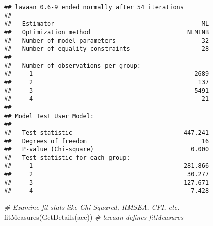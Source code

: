 \documentclass[smallextended]{svjour3}       %
\newenvironment{Shaded}{\begin{snugshade}}{\end{snugshade}}
\newcommand{\CommentTok}[1]{\textcolor[rgb]{0.56,0.35,0.01}{\textit{#1}}}
\newcommand{\FunctionTok}[1]{\textcolor[rgb]{0.00,0.00,0.00}{#1}}
\newcommand{\NormalTok}[1]{#1}
\begin{document}
\begin{verbatim}
## lavaan 0.6-9 ended normally after 54 iterations
## 
##   Estimator                                         ML
##   Optimization method                           NLMINB
##   Number of model parameters                        32
##   Number of equality constraints                    28
##                                                       
##   Number of observations per group:                   
##     1                                             2689
##     2                                              137
##     3                                             5491
##     4                                               21
##                                                       
## Model Test User Model:
##                                                       
##   Test statistic                               447.241
##   Degrees of freedom                                16
##   P-value (Chi-square)                           0.000
##   Test statistic for each group:
##     1                                          281.866
##     2                                           30.277
##     3                                          127.671
##     4                                            7.428
\end{verbatim}

\begin{Shaded}
\begin{Highlighting}[]
\CommentTok{\# Examine fit stats like Chi{-}Squared, RMSEA, CFI, etc.}
\FunctionTok{fitMeasures}\NormalTok{(}\FunctionTok{GetDetails}\NormalTok{(ace)) }\CommentTok{\# lavaan defines fitMeasures }
\end{Highlighting}
\end{Shaded}
\end{document}
